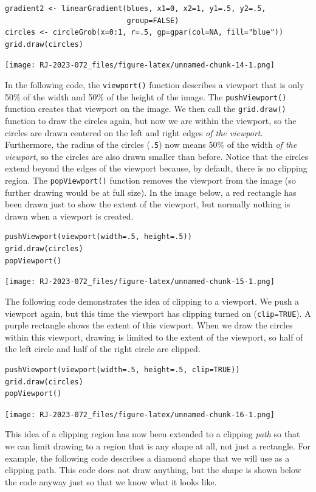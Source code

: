 \begin{verbatim}
gradient2 <- linearGradient(blues, x1=0, x2=1, y1=.5, y2=.5,
                            group=FALSE)
circles <- circleGrob(x=0:1, r=.5, gp=gpar(col=NA, fill="blue"))
grid.draw(circles)
\end{verbatim}

\texttt{[image: RJ-2023-072\_files/figure-latex/unnamed-chunk-14-1.png]}

In the following code,
the \texttt{viewport()} function describes a viewport that is only 50\%
of the width and 50\% of the height of the image. The
\texttt{pushViewport()} function creates that viewport on the image.
We then call the \texttt{grid.draw()} function to draw the circles again,
but now we are within the viewport,
so the circles are drawn centered on the left and right edges
\emph{of the viewport}. Furthermore,
the radius of the circles (\texttt{.5})
now means 50\% of the width \emph{of the viewport}, so the circles
are also drawn smaller than before. Notice that the circles
extend beyond the edges of the viewport because, by default,
there is no clipping region.
The \texttt{popViewport()} function removes the viewport from the image
(so further drawing would be at full size).
In the image below, a red rectangle has been drawn just to show
the extent of the viewport, but normally nothing is drawn when
a viewport is created.

\begin{verbatim}
pushViewport(viewport(width=.5, height=.5))
grid.draw(circles)
popViewport()
\end{verbatim}

\texttt{[image: RJ-2023-072\_files/figure-latex/unnamed-chunk-15-1.png]}

The following code demonstrates the idea of clipping to a viewport.
We push a viewport again, but this time the viewport has clipping
turned on (\texttt{clip=TRUE}). A purple rectangle
shows the extent of this viewport. When we draw the circles within
this viewport, drawing
is limited to the extent of the viewport, so half of the
left circle and half of the right circle are clipped.

\begin{verbatim}
pushViewport(viewport(width=.5, height=.5, clip=TRUE))
grid.draw(circles)
popViewport()
\end{verbatim}

\texttt{[image: RJ-2023-072\_files/figure-latex/unnamed-chunk-16-1.png]}

This idea of a clipping region has now been extended to a clipping \emph{path}
so that we can limit drawing to a region that is any shape at all,
not just a rectangle.
For example, the following code describes a diamond shape
that we will use as a clipping path. This code does not draw anything,
but the shape is shown below the code anyway just so that we know what it looks
like.

